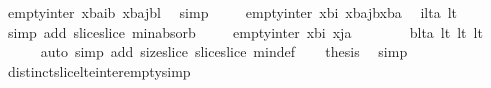 \begin{isabellebody}
\ {\isachardoublequoteopen}empty{\isacharunderscore}inter\ {\isacharparenleft}{\isacharparenleft}x{\isasymdagger}b{\isachardot}{\isachardot}a{\isacharparenright}{\isasymdagger}{}{\isachardot}{\isachardot}{\isacharparenleft}i{\isacharminus}b{\isacharparenright}{\isacharparenright}\ {\isacharparenleft}{\isacharparenleft}x{\isasymdagger}b{\isachardot}{\isachardot}a{\isacharparenright}{\isasymdagger}{\isacharparenleft}j{\isacharminus}b{\isacharparenright}{\isachardot}{\isachardot}{\isacharparenleft}{\isacharhash}{\isacharquery}l{\isacharparenright}{\isacharparenright}{\isachardoublequoteclose}\ \isamarkupfalse%
\ simp\isanewline
\ \ \isamarkupfalse%
\ {}{\isacharcolon}\ {\isachardoublequoteopen}empty{\isacharunderscore}inter\ {\isacharparenleft}x{\isasymdagger}b{\isachardot}{\isachardot}i{\isacharparenright}\ {\isacharparenleft}{\isacharparenleft}x{\isasymdagger}b{\isachardot}{\isachardot}a{\isacharparenright}{\isasymdagger}{\isacharparenleft}j{\isacharminus}b{\isacharparenright}{\isachardot}{\isachardot}{\isacharparenleft}{\isacharhash}{\isacharparenleft}x{\isasymdagger}b{\isachardot}{\isachardot}a{\isacharparenright}{\isacharparenright}{\isacharparenright}{\isachardoublequoteclose}\ \isamarkupfalse%
\ ilta\ lt{}\isanewline
\ \ \ \ \isamarkupfalse%
\ {\isacharparenleft}simp\ add{\isacharcolon}\ slice{\isacharunderscore}slice\ min{\isacharunderscore}absorb{}{\isacharparenright}\isanewline
\ \ \isamarkupfalse%
\ {}{\isacharcolon}\ {\isachardoublequoteopen}empty{\isacharunderscore}inter\ {\isacharparenleft}x{\isasymdagger}b{\isachardot}{\isachardot}i{\isacharparenright}\ {\isacharparenleft}x{\isasymdagger}j{\isachardot}{\isachardot}a{\isacharparenright}{\isachardoublequoteclose}\ \ \isanewline
\ \ \ \ \isamarkupfalse%
\ blta\ lt{}\ lt{}\ lt{}\ \isanewline
\ \ \ \ \isamarkupfalse%
\ {\isacharparenleft}auto\ simp\ add{\isacharcolon}\ size{\isacharunderscore}slice\ slice{\isacharunderscore}slice\ min{\isacharunderscore}def{\isacharparenright}\isanewline
\ \ \isamarkupfalse%
\ {\isacharquery}thesis\ \isamarkupfalse%
\ simp\isanewline
{}\isamarkupfalse%
%
\endisatagproof
{\isafoldproof}%
%
\isadelimproof
\isanewline
%
\endisadelimproof
\isanewline
{}\isamarkupfalse%
\ distinct{\isacharunderscore}slice{\isacharunderscore}lte{\isacharunderscore}inter{\isacharunderscore}empty{\isacharbrackleft}simp{\isacharbrackright}{\isacharcolon}\ \isanewline

\end{isabellebody}
